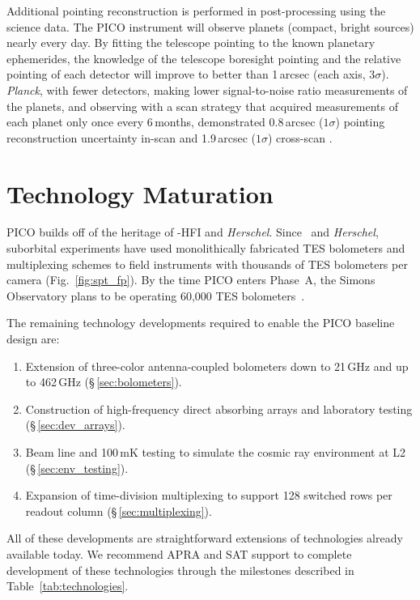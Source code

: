 Additional pointing reconstruction is performed in post-processing
using the science data.  The PICO instrument will observe planets
(compact, bright sources) nearly every day.  By fitting the telescope
pointing to the known planetary ephemerides, the knowledge of the
telescope boresight pointing and the relative pointing of each
detector will improve to better than 1\,arcsec (each axis, $3\sigma$). \textit{Planck},
with fewer detectors, making lower signal-to-noise ratio measurements
of the planets, and observing with a scan strategy that acquired
measurements of each planet only once every 6\,months, demonstrated 0.8\,arcsec ($1\sigma$) pointing reconstruction uncertainty in-scan and 1.9\,arcsec ($1\sigma$) cross-scan \citep{2016A&A...594A...1P}.

\bigskip
\section{Technology Maturation}
\label{sec:technology_maturation} %

PICO builds off of the heritage of \planck-HFI and \textit{Herschel}.  Since \planck\ and \textit{Herschel}, suborbital experiments have used monolithically fabricated TES bolometers and multiplexing schemes to field instruments with thousands of \ac{TES} bolometers per camera (Fig.~\ref{fig:spt_fp}). By the time PICO enters Phase~A, the Simons Observatory plans to be operating 60,000 \ac{TES} bolometers~\citep{Simons2018}.

 The remaining technology developments required to enable the PICO baseline design are:
\begin{enumerate}
\item Extension of three-color antenna-coupled bolometers down to 21\,GHz and up to 462\,GHz (\S\,\ref{sec:bolometers}).
\item Construction of high-frequency direct absorbing arrays and laboratory testing (\S\,\ref{sec:dev_arrays}).
\item Beam line and 100\,mK testing to simulate the cosmic ray environment at L2 (\S\,\ref{sec:env_testing}).
\item Expansion of time-division multiplexing to support 128 switched rows per readout column (\S\,\ref{sec:multiplexing}).
\end{enumerate}
All of these developments are straightforward extensions of technologies already available today.  We recommend APRA and SAT support to complete development of these technologies through the milestones described in Table~\ref{tab:technologies}.


